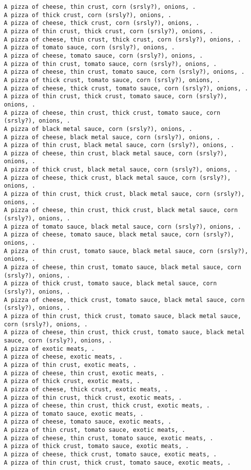 \documentclass[11pt]{article}
\begin{document}
\begin{enumerate}
\begin{verbatim}
A pizza of cheese, thin crust, corn (srsly?), onions, .
A pizza of thick crust, corn (srsly?), onions, .
A pizza of cheese, thick crust, corn (srsly?), onions, .
A pizza of thin crust, thick crust, corn (srsly?), onions, .
A pizza of cheese, thin crust, thick crust, corn (srsly?), onions, .
A pizza of tomato sauce, corn (srsly?), onions, .
A pizza of cheese, tomato sauce, corn (srsly?), onions, .
A pizza of thin crust, tomato sauce, corn (srsly?), onions, .
A pizza of cheese, thin crust, tomato sauce, corn (srsly?), onions, .
A pizza of thick crust, tomato sauce, corn (srsly?), onions, .
A pizza of cheese, thick crust, tomato sauce, corn (srsly?), onions, .
A pizza of thin crust, thick crust, tomato sauce, corn (srsly?), onions, .
A pizza of cheese, thin crust, thick crust, tomato sauce, corn (srsly?), onions, .
A pizza of black metal sauce, corn (srsly?), onions, .
A pizza of cheese, black metal sauce, corn (srsly?), onions, .
A pizza of thin crust, black metal sauce, corn (srsly?), onions, .
A pizza of cheese, thin crust, black metal sauce, corn (srsly?), onions, .
A pizza of thick crust, black metal sauce, corn (srsly?), onions, .
A pizza of cheese, thick crust, black metal sauce, corn (srsly?), onions, .
A pizza of thin crust, thick crust, black metal sauce, corn (srsly?), onions, .
A pizza of cheese, thin crust, thick crust, black metal sauce, corn (srsly?), onions, .
A pizza of tomato sauce, black metal sauce, corn (srsly?), onions, .
A pizza of cheese, tomato sauce, black metal sauce, corn (srsly?), onions, .
A pizza of thin crust, tomato sauce, black metal sauce, corn (srsly?), onions, .
A pizza of cheese, thin crust, tomato sauce, black metal sauce, corn (srsly?), onions, .
A pizza of thick crust, tomato sauce, black metal sauce, corn (srsly?), onions, .
A pizza of cheese, thick crust, tomato sauce, black metal sauce, corn (srsly?), onions, .
A pizza of thin crust, thick crust, tomato sauce, black metal sauce, corn (srsly?), onions, .
A pizza of cheese, thin crust, thick crust, tomato sauce, black metal sauce, corn (srsly?), onions, .
A pizza of exotic meats, .
A pizza of cheese, exotic meats, .
A pizza of thin crust, exotic meats, .
A pizza of cheese, thin crust, exotic meats, .
A pizza of thick crust, exotic meats, .
A pizza of cheese, thick crust, exotic meats, .
A pizza of thin crust, thick crust, exotic meats, .
A pizza of cheese, thin crust, thick crust, exotic meats, .
A pizza of tomato sauce, exotic meats, .
A pizza of cheese, tomato sauce, exotic meats, .
A pizza of thin crust, tomato sauce, exotic meats, .
A pizza of cheese, thin crust, tomato sauce, exotic meats, .
A pizza of thick crust, tomato sauce, exotic meats, .
A pizza of cheese, thick crust, tomato sauce, exotic meats, .
A pizza of thin crust, thick crust, tomato sauce, exotic meats, .



\end{verbatim}
\end{enumerate}
\end{document}
